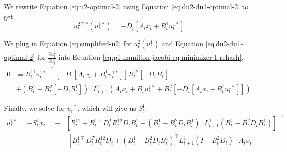 \documentclass[11pt]{article}
\newcommand{\T}{\intercal}
\newcommand\dd[2]{\frac{\partial#1}{\partial#2}}
\def\doubleunderline#1{\underline{\underline{#1}}}
\begin{document}
We rewrite Equation \ref{eq:u2-optimal-2} using Equation \ref{eq:du2-du1-optimal-2} to get
\begin{equation}
\label{eq:simplified-u2}
u^{2\T*}_t(u^{1*}_t) = -D_t [A_t x_t + B^1_t u^{1*}_t]
\end{equation}

We plug in Equation \ref{eq:simplified-u2} for $\underline{u^2_t(u^1_t)}$ and Equation \ref{eq:du2-du1-optimal-2} for $\doubleunderline{\dd{u^{2}_t}{u^{1}_t}}$ into Equation \ref{eq:p1-hamilton-jacobi-eq-minimizer-1-rehash}.
\begin{equation}
\begin{split}
\label{eq:u1-equation-with-u2-and-du2du1}
0 &= R^{11}_t u^{1*}_t + \left[ -D_t [A_t x_t + B^1_t u^{1*}_t] \right] R^{12}_t \left[ -D_tB^1_t \right] \\
&+ \left(B^1_t + B^2_t \left[ -D_tB^1_t \right] \right)^\T L^1_{t+1} \left( A_t x_t + B^1_t u^{1*}_t + B^2_t \left[ -D_t [A_t x_t + B^1_t u^{1*}_t] \right] \right)
\end{split}
\end{equation}

Finally, we solve for $u^{1*}_t$, which will give us $S^1_t$.
\begin{equation}
\label{eq:u1-optimal}
\begin{split}
u^{1*}_t = -S^1_t x_t
    = -&\left[ R^{11}_t 
             + B^{1\T}_t D_t^T R^{12}_t D_t B^1_t
             + \left( B^1_t - B^2_t D_t B^1_t \right)^\T
               L^1_{t+1}
               \left( B^1_t - B^2_t D_t B^1_t \right)
      \right]^{-1} \\
    &\cdot  \left[ B^{1\T}_t D_t^T R^{12}_t D_t + \left( B^1_t - B^2_t D_t B^1_t \right)^\T
               L^1_{t+1} \left(I - B^2_t D_t\right) \right] A_t x_t
\end{split}
\end{equation}

\end{document}
